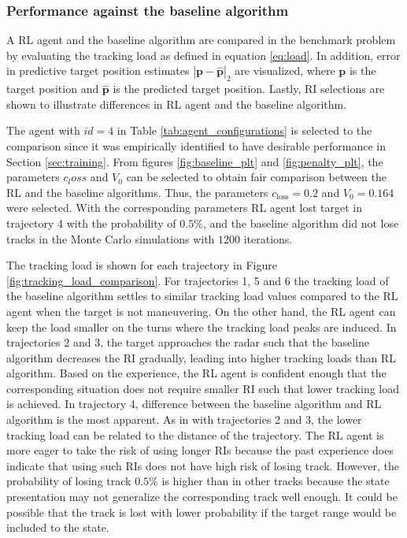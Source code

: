 \documentclass[english, 12pt, a4paper, elec, utf8, a-1b, online]{aaltothesis}
\renewcommand{\vec}[1]{\mathbf{#1}}
\newcommand{\closs}{c_\text{loss}}
\begin{document}
\subsubsection{Performance against the baseline algorithm} \label{sec:against_baseline}

A RL agent and the baseline algorithm are compared in the benchmark problem by evaluating the tracking load as defined in equation \eqref{eq:load}.
In addition, error in predictive target position estimates $|\vec{p}-\hat{\vec{p}}|_2$ are visualized, where $\vec{p}$ is the target position and $\hat{\vec{p}}$ is the predicted target position.
Lastly, RI selections are shown to illustrate differences in RL agent and the baseline algorithm.

The agent with $id=4$ in Table \ref{tab:agent_configurations} is selected to the comparison since it was empirically identified to have desirable performance in Section \ref{sec:training}.
From figures \ref{fig:baseline_plt} and \ref{fig:penalty_plt}, the parameters $c_loss$ and $V_0$ can be selected to obtain fair comparison between the RL and the baseline algorithms.
Thus, the parameters $\closs = 0.2$ and $V_0=0.164$ were selected.
With the corresponding parameters RL agent lost target in trajectory 4 with the probability of $0.5\%$, and the baseline algorithm did not lose tracks in the Monte Carlo simulations with $1200$ iterations.

The tracking load is shown for each trajectory in Figure \ref{fig:tracking_load_comparison}.
For trajectories 1, 5 and 6 the tracking load of the baseline algorithm settles to similar tracking load values compared to the RL agent when the target is not maneuvering.
On the other hand, the RL agent can keep the load smaller on the turns where the tracking load peaks are induced.
In trajectories 2 and 3, the target approaches the radar such that the baseline algorithm decreases the RI gradually, leading into higher tracking loads than RL algorithm.
Based on the experience, the RL agent is confident enough that the corresponding situation does not require smaller RI such that lower tracking load is achieved.
In trajectory 4, difference between the baseline algorithm and RL algorithm is the most apparent.
As in with trajectories 2 and 3, the lower tracking load can be related to the distance of the trajectory.
The RL agent is more eager to take the risk of using longer RIs because the past experience does indicate that using such RIs does not have high risk of losing track.
However, the probability of losing track $0.5\%$ is higher than in other tracks because the state presentation may not generalize the corresponding track well enough.
It could be possible that the track is lost with lower probability if the target range would be included to the state.
\end{document}
